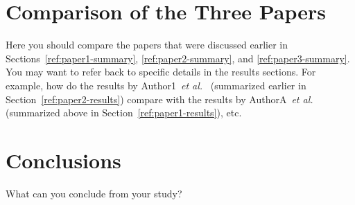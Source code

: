 \documentclass[11pt]{article}
\begin{document}
\section{Comparison of the Three Papers}
\label{ref:comparison-section}

Here you should compare the papers that were discussed earlier in
Sections~\ref{ref:paper1-summary}, \ref{ref:paper2-summary}, and
\ref{ref:paper3-summary}.  You may want to refer back to specific details
in the results sections.  For example, how do the results by
Author1~\emph{et al.}~\cite{ConferencePaperExampleTag} (summarized earlier
in Section~\ref{ref:paper2-results}) compare with the results by
AuthorA~\emph{et al.}~\cite{JournalPaperExampleTag} (summarized above in
Section~\ref{ref:paper1-results}), etc.

\section{Conclusions}
\label{ref:conclusions-section}

What can you conclude from your study?  



\end{document}
